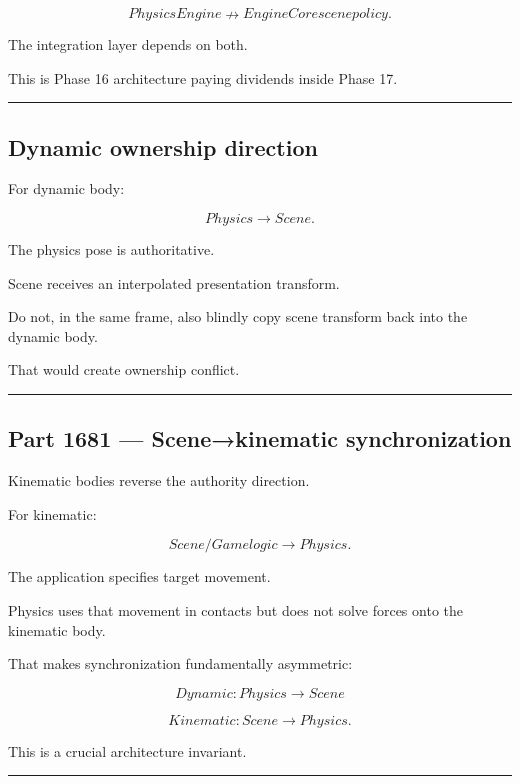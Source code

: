 \[
PhysicsEngine
\nrightarrow
EngineCore scene policy.
\]

The integration layer depends on both.

This is Phase 16 architecture paying dividends inside Phase 17.

\begin{center}\rule{0.5\linewidth}{0.5pt}\end{center}

\subsection{Dynamic ownership direction}\label{06-engine-ii-ch037-dynamic-ownership-direction}

For dynamic body:

\[
\boxed{
Physics\rightarrow Scene.
}
\]

The physics pose is authoritative.

Scene receives an interpolated presentation transform.

Do not, in the same frame, also blindly copy scene transform back into the dynamic body.

That would create ownership conflict.

\begin{center}\rule{0.5\linewidth}{0.5pt}\end{center}

\subsection{Part 1681 --- Scene→kinematic synchronization}\label{06-engine-ii-ch037-part-1681-scenekinematic-synchronization}

Kinematic bodies reverse the authority direction.

For kinematic:

\[
\boxed{
Scene/Game logic\rightarrow Physics.
}
\]

The application specifies target movement.

Physics uses that movement in contacts but does not solve forces onto the kinematic body.

That makes synchronization fundamentally asymmetric:

\[
Dynamic:
Physics\rightarrow Scene
\]

\[
Kinematic:
Scene\rightarrow Physics.
\]

This is a crucial architecture invariant.

\begin{center}\rule{0.5\linewidth}{0.5pt}\end{center}

